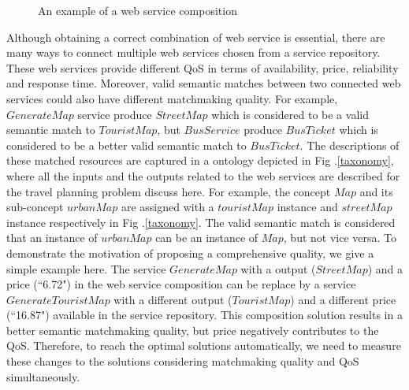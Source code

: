 \begin{figure}[h]
\centering
{}
 \caption{ An example of a web service composition}
 \label{motivation}
\end{figure}

Although obtaining a correct combination of web service is essential, there are many ways to connect multiple web services chosen from a service repository. These web services provide different QoS in terms of availability, price, reliability and response time. Moreover, valid semantic matches between two connected web services could also have different matchmaking quality. For example, $Generate Map$ service produce $StreetMap$ which is considered to be a valid semantic match to $TouristMap$, but $Bus Service$ produce $BusTicket$ which is considered to be a better valid semantic match to $BusTicket$. The descriptions of these matched resources are captured in a ontology depicted in Fig .\ref{taxonomy}, where all the inputs and the outputs related to the web services are described for the travel planning problem discuss here. For example, the concept $Map$ and its sub-concept $urbanMap$ are assigned with a $touristMap$ instance and $streetMap$ instance respectively in Fig .\ref{taxonomy}. The valid semantic match is considered that an instance of $urban Map$ can be an instance of $Map$, but not vice versa. To demonstrate the motivation of proposing a comprehensive quality, we give a simple example here. The service $GenerateMap$ with a output ($StreetMap$) and a price (``6.72") in the web service composition can be replace by a service $GenerateTouristMap$ with a different output ($TouristMap$) and a different price (``16.87") available in the service repository. This composition solution results in a better semantic matchmaking quality, but price negatively contributes to the QoS. Therefore, to reach the optimal solutions automatically, we need to measure these changes to the solutions considering matchmaking quality and QoS simultaneously. 



